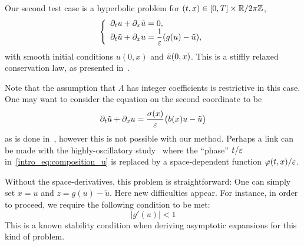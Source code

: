 Our second test case is a hyperbolic problem for $(t,x) \in [0,T] \times \mathbb{R}/2\pi \mathbb Z$, 
\begin{equation} \label{test_eq:cont_hyperb_uv}
\left\{ \begin{array}{l}
\partial_t u + \partial_{x} \tilde{u} = 0 , \\ \displaystyle
\partial_t \tilde{u} + \partial_{x} u = \frac{1}{\varepsilon}(g(u) - \tilde{u}) ,
\end{array} \right .
\end{equation}
with smooth initial conditions $ u(0,x) $ and $ \tilde{u}(0,x) $. 
This is a stiffly relaxed conservation law, as presented in~\cite{jin.1995.relaxation}. 

\begin{remark} \label{sec:pde:rmk:space_dep}
Note that the assumption that $\Lambda$ has integer coefficients is restrictive in this case. 
One may want to consider the equation on the second coordinate to be 
\begin{equation*}
  \partial_t \tilde{u} + \partial_{x} u = \frac{\sigma(x)}{\varepsilon} \big(b(x)u - \tilde{u} \big)
\end{equation*}
as is done in~\cite{hu.2021.uniform}, however this is not possible with our
method. Perhaps a link can be made with the highly-oscillatory
study~\cite{crouseilles.2017.nonlinear} where the ``phase'' $t/\varepsilon$
in~\eqref{intro_eq:composition_u} is replaced by a space-dependent
function $\varphi(t,x)/\varepsilon$. 
\end{remark}

Without the space-derivatives, this problem is straightforward: One can
simply set $x = u$ and $z = g(u) - \tilde{u}$. Here new difficulties
appear. For instance, in order to proceed, we require the following
condition to be met: 
\begin{equation} \label{test_hyp:conserv_stab}
|g'(u)| < 1
\end{equation}
This is a known stability condition when deriving asymptotic expansions for this kind of problem. 

